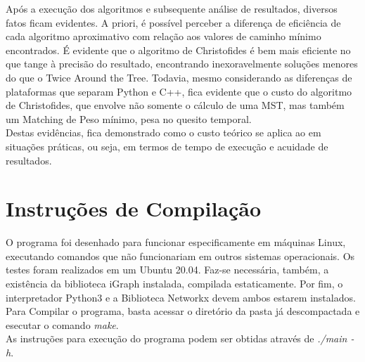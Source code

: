 \documentclass{article}
\begin{document}
Após a execução dos algoritmos e subsequente análise de resultados, diversos fatos ficam evidentes. A priori, é possível perceber a diferença de eficiência de cada algoritmo aproximativo com relação aos valores de caminho mínimo encontrados. É evidente que o algoritmo de Christofides é bem mais eficiente no que tange à precisão do resultado, encontrando inexoravelmente soluções menores do que o Twice Around the Tree. Todavia, mesmo considerando as diferenças de plataformas que separam Python e C++, fica evidente que o custo do algoritmo de Christofides, que envolve não somente o cálculo de uma MST, mas também um Matching de Peso mínimo, pesa no quesito temporal. \\ 
Destas evidências, fica demonstrado como o custo teórico se aplica ao em situações práticas, ou seja, em termos de tempo de execução e acuidade de resultados.

\section{Instruções de Compilação}
O programa foi desenhado para funcionar especificamente em máquinas Linux, executando comandos que não funcionariam em outros sistemas operacionais. Os testes foram realizados em um Ubuntu 20.04. Faz-se necessária, também, a existência da biblioteca iGraph instalada, compilada estaticamente. Por fim, o interpretador Python3 e a Biblioteca Networkx devem ambos estarem instalados. \\
Para Compilar o programa, basta acessar o diretório da pasta já descompactada e esecutar o comando \textit{make}.\\
As instruções para execução do programa podem ser obtidas através de \textit{./main -h}.
\end{document}
